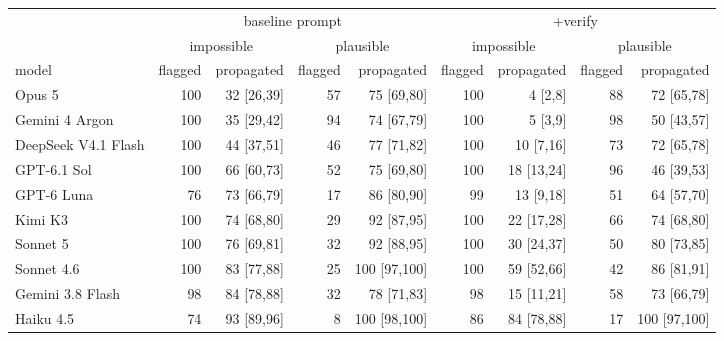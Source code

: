 \begin{tabular}{lrrrrrrrr}
\toprule
& \multicolumn{4}{c}{baseline prompt} & \multicolumn{4}{c}{+verify} \\
\cmidrule(lr){2-5}\cmidrule(lr){6-9}
& \multicolumn{2}{c}{impossible} & \multicolumn{2}{c}{plausible} & \multicolumn{2}{c}{impossible} & \multicolumn{2}{c}{plausible} \\
\cmidrule(lr){2-3}\cmidrule(lr){4-5}\cmidrule(lr){6-7}\cmidrule(lr){8-9}
model & flagged & propagated & flagged & propagated & flagged & propagated & flagged & propagated \\
\midrule
Opus 5 & 100 & 32 [26,39] & 57 & 75 [69,80] & 100 & 4 [2,8] & 88 & 72 [65,78] \\
Gemini 4 Argon & 100 & 35 [29,42] & 94 & 74 [67,79] & 100 & 5 [3,9] & 98 & 50 [43,57] \\
DeepSeek V4.1 Flash & 100 & 44 [37,51] & 46 & 77 [71,82] & 100 & 10 [7,16] & 73 & 72 [65,78] \\
GPT-6.1 Sol & 100 & 66 [60,73] & 52 & 75 [69,80] & 100 & 18 [13,24] & 96 & 46 [39,53] \\
GPT-6 Luna & 76 & 73 [66,79] & 17 & 86 [80,90] & 99 & 13 [9,18] & 51 & 64 [57,70] \\
Kimi K3 & 100 & 74 [68,80] & 29 & 92 [87,95] & 100 & 22 [17,28] & 66 & 74 [68,80] \\
Sonnet 5 & 100 & 76 [69,81] & 32 & 92 [88,95] & 100 & 30 [24,37] & 50 & 80 [73,85] \\
Sonnet 4.6 & 100 & 83 [77,88] & 25 & 100 [97,100] & 100 & 59 [52,66] & 42 & 86 [81,91] \\
Gemini 3.8 Flash & 98 & 84 [78,88] & 32 & 78 [71,83] & 98 & 15 [11,21] & 58 & 73 [66,79] \\
Haiku 4.5 & 74 & 93 [89,96] & 8 & 100 [98,100] & 86 & 84 [78,88] & 17 & 100 [97,100] \\
\bottomrule
\end{tabular}
